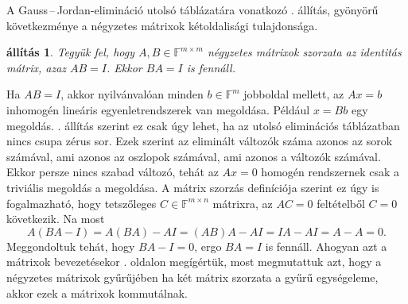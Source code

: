 \documentclass[a4paper, showtrims]{memoir}
\makeatletter
\renewenvironment{proof}[1][\proofname]
    {\par\pushQED{\qed}%
    \normalfont \topsep6\p@\@plus6\p@\relax
    \trivlist
    \item[\hskip\labelsep
        \itshape
    #1\@addpunct{:}]\ignorespaces}
    {\popQED\endtrivlist\@endpefalse}
\theoremstyle{plain}
\newtheorem{proposition}{állítás}[chapter]
\theoremstyle{remark}
\theoremstyle{definition}
\makeatother
\begin{document}
A Gauss\,--\,Jordan-elimináció utolsó táblázatára vonatkozó . állítás, gyönyörű
következménye a négyzetes mátrixok kétoldalisági tulajdonsága.
\begin{proposition}
    Tegyük fel, hogy $A,B\in\mathbb{F}^{m\times m}$ négyzetes mátrixok szorzata az identitás mátrix,
    azaz $AB=I$.
    Ekkor $BA=I$ is fennáll.
    \label{pr:ketoldal}
\end{proposition}
\begin{proof}
    Ha $AB=I$, akkor nyilvánvalóan minden $b\in\mathbb{F}^m$ jobboldal mellett,
    az $Ax=b$ inhomogén lineáris egyenletrendszerek van megoldása. 
    Például $x=Bb$ egy megoldás.
    . állítás szerint ez csak úgy lehet, ha az utolsó eliminációs táblázatban nincs csupa zérus sor.
    Ezek szerint az eliminált változók száma azonos az sorok számával, ami azonos az oszlopok számával, ami azonos a változók számával.
    Ekkor persze nincs szabad változó, tehát az $Ax=0$ homogén rendszernek csak a triviális megoldás a megoldása.
    A mátrix szorzás definíciója szerint ez úgy is fogalmazható, hogy
    tetszőleges $C\in\mathbb{F}^{m\times n}$ mátrixra, az $AC=0$ feltételből $C=0$ következik.
    Na most
    \[
        A\left(BA-I  \right)=A\left( BA \right)-AI=\left( AB \right)A-AI=IA-AI=A-A=0.
    \]
    Meggondoltuk tehát, hogy $BA-I=0$, ergo $BA=I$ is fennáll.
\end{proof}
Ahogyan azt a mátrixok bevezetésekor \aazt{\pageref{pg:kommutal}}. oldalon megígértük,
most megmutattuk azt, hogy a négyzetes mátrixok gyűrűjében ha két mátrix szorzata a gyűrű
egységeleme, akkor ezek a mátrixok kommutálnak.
\end{document}
